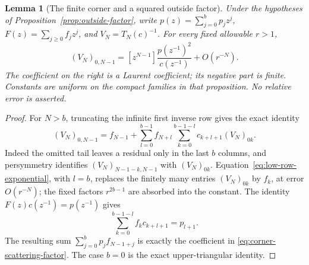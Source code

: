 \documentclass[11pt]{article}
\newtheorem{lemma}[proposition]{Lemma}
\begin{document}
\begin{lemma}[The finite corner and a squared outside factor]
\label{lem:corner-scattering-factor}
Under the hypotheses of Proposition~\ref{prop:outside-factor}, write
$p(z)=\sum_{j=0}^b p_jz^j$, $F(z)=\sum_{j\ge0}f_jz^j$,
and $V_N=T_N(c)^{-1}$. For every fixed allowable $r>1$,
\begin{equation}\label{eq:corner-scattering-factor}
 (V_N)_{0,N-1}
 =[z^{N-1}]\frac{p(z^{-1})^2}{c(z^{-1})}+O(r^{-N}).
\end{equation}
The coefficient on the right is a Laurent coefficient; its negative
part is finite. Constants are uniform on the compact families in that
proposition. No relative error is asserted.
\end{lemma}
\begin{proof}
For $N>b$, truncating the infinite first inverse row gives the exact
identity
\[
 (V_N)_{0,N-1}=f_{N-1}
 +\sum_{l=0}^{b-1}f_{N+l}
       \sum_{k=0}^{b-1-l}c_{k+l+1}(V_N)_{0k}.
\]
Indeed the omitted tail leaves a residual only in the last $b$ columns,
and persymmetry identifies $(V_N)_{N-1-k,N-1}$ with $(V_N)_{0k}$.
Equation~\eqref{eq:low-row-exponential}, with $l=b$, replaces the
finitely many entries $(V_N)_{0k}$ by $f_k$, at error $O(r^{-N})$;
the fixed factors $r^{2b-1}$ are absorbed into the constant.
The identity $F(z)c(z^{-1})=p(z^{-1})$ gives
\[
 \sum_{k=0}^{b-1-l} f_kc_{k+l+1}=p_{l+1}.
\]
The resulting sum $\sum_{j=0}^b p_jf_{N-1+j}$ is exactly the
coefficient in \eqref{eq:corner-scattering-factor}. The case $b=0$
is the exact upper-triangular identity.
\end{proof}
\end{document}
